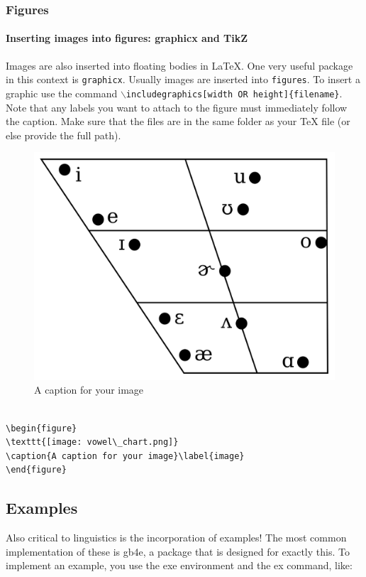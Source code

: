 \documentclass[a4paper, 12pt]{article} %
\begin{document}
\subsubsection{Figures}

\paragraph{Inserting images into figures: graphicx and TikZ}
Images are also inserted into floating bodies in \LaTeX{}. One very useful package in this context is \texttt{graphicx}. Usually images are inserted into \texttt{figures}. To insert a graphic use the command $\backslash$\texttt{includegraphics[width OR height]\{filename\}}. Note that any labels you want to attach to the figure must immediately follow the caption. Make sure that the files are in the same folder as your \TeX{} file (or else provide the full path).

\begin{figure}
\includegraphics{vowelchart.png}
\caption{A caption for your image}\label{image}
\end{figure}

\begin{verbatim}

\begin{figure}
\texttt{[image: vowel\_chart.png]}
\caption{A caption for your image}\label{image}
\end{figure}
\end{verbatim}


\subsection{Examples}
Also critical to linguistics is the incorporation of examples! The most common implementation of these is gb4e, a package that is designed for exactly this. To implement an example, you use the exe environment and the ex command, like:
\end{document}
